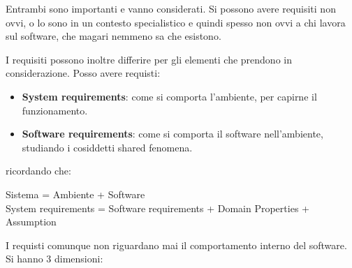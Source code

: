 Entrambi sono importanti e vanno considerati. Si possono avere requisiti non ovvi,
o lo sono in un contesto specialistico e quindi spesso non ovvi a chi lavora
sul software, che magari nemmeno sa che esistono.

I requisiti possono inoltre differire per gli elementi che prendono in considerazione.
Posso avere requisti:
\begin{itemize}
    \item \textbf{System requirements}: come si comporta l'ambiente, per capirne
          il funzionamento.
    \item \textbf{Software requirements}: come si comporta il software
          nell'ambiente, studiando i cosiddetti shared fenomena.
\end{itemize}
ricordando che:
\begin{center}
    Sistema = Ambiente + Software \\ System requirements = Software requirements
    + Domain Properties + Assumption
\end{center}
I requisti comunque non riguardano mai il comportamento interno del software.
\newline Si hanno 3 dimensioni:
